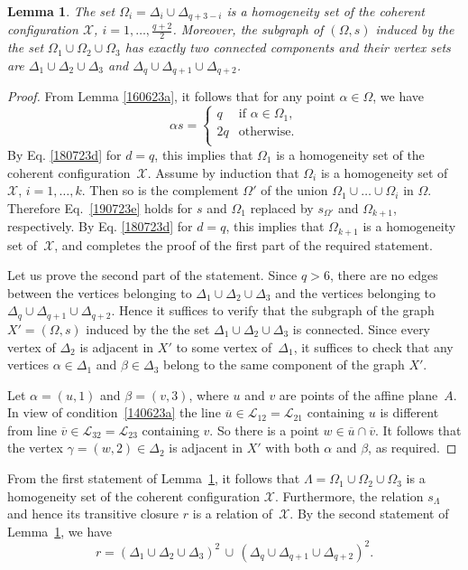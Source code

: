 \documentclass{amsart}
\newcommand{\cal}{\mathcal}
\newtheorem{lemma}[formula]{Lemma}
\def\qtnl#1{\begin{equation}\label{#1}}
\def\eqtn{\end{equation}}
\def\lmml#1{\begin{lemma}\label{#1}}
\def\elmm{\end{lemma}}
\def\css{\begin{cases}}
\def\ecss{\end{cases}}
\def\prf{\begin{proof}}
\def\eprf{\end{proof}}
\def\cL{{\cal L}}
\def\cX{{\cal X}}
\def\ov{\overline}
\begin{document}
\lmml{160623b}
The set $\Omega_i=\Delta_i\cup\Delta_{q+3-i}$ is a homogeneity set of the coherent configuration $\cX$, $i=1,\ldots,\frac{q+2}{2}$.  Moreover, the subgraph of $(\Omega,s)$ induced by the the set $\Omega_1\cup\Omega_2\cup\Omega_3$ has exactly two connected components and their vertex sets are $\Delta_1\cup \Delta_2\cup\Delta_3$ and $\Delta_q\cup\Delta_{q+1}\cup \Delta_{q+2}$. 
\elmm
\prf
From Lemma \ref{160623a}, it follows that for any point $\alpha\in\Omega$, we have  
\qtnl{190723e}
\alpha s=\css
q  &\text{if $\alpha\in\Omega_1$},\\
2q &\text{otherwise.}\\
\ecss
\eqtn
By Eq. \eqref{180723d} for $d=q$, this implies that $\Omega_1$ is a homogeneity set of the coherent configuration~$\cX$. Assume by  induction that $\Omega_i$ is a homogeneity set of~$\cX$, $i=1,\ldots,k$. Then so is the complement $\Omega'$ of the union $\Omega_1\cup\ldots\cup\Omega_i$ in $\Omega$.   Therefore Eq.~\eqref{190723e} holds for $s$ and  $\Omega_1$ replaced by $s_{\Omega'}$ and $\Omega_{k+1}$, respectively. 
By Eq. \eqref{180723d} for $d=q$, this implies that $\Omega_{k+1}$ is a homogeneity set of~$\cX$, and completes the proof of the first part of the required statement. 

Let us prove the second part of the statement. Since $q>6$, there are no edges between the vertices belonging to $\Delta_1\cup \Delta_2\cup\Delta_3$ and  the vertices belonging to  $\Delta_q\cup\Delta_{q+1}\cup \Delta_{q+2}$. Hence it suffices to verify that the subgraph of the graph $X'=(\Omega,s)$ induced by the the set $\Delta_1\cup \Delta_2\cup\Delta_3$ is connected. Since every vertex of $\Delta_2$ is adjacent in  $X'$ to some vertex of~$\Delta_1$, it suffices to check that any vertices $\alpha\in\Delta_1$ and $\beta\in\Delta_3$ belong to the same component of the graph $X'$.

Let $\alpha=(u,1)$ and $\beta=(v,3)$, where $u$ and $v$ are points of the affine plane~$A$. In view of condition~\eqref{140623a}  the line $\ov u\in\cL_{12}=\cL_{21}$ containing $u$ is different from line $\ov v\in\cL_{32}=\cL_{23}$ containing $v$. So there is a point $w\in \ov u\cap\ov v$. It follows that the vertex $\gamma=(w,2)\in\Delta_2$ is adjacent in $X'$ with both $\alpha$ and $\beta$, as required.
\eprf

From the first statement of Lemma~\ref{160623b}, it follows that $\Lambda=\Omega_1\cup\Omega_2\cup\Omega_3$ is a homogeneity set of the coherent configuration $\cX$. Furthermore, the relation $s_\Lambda$ and hence its  transitive closure $r$  is a relation of~$\cX$. By the second statement of Lemma~\ref{160623b}, we have 
$$
r=(\Delta_1\cup \Delta_2\cup\Delta_3)^2\,\cup\,(\Delta_q\cup\Delta_{q+1}\cup \Delta_{q+2})^2.
$$
\end{document}
